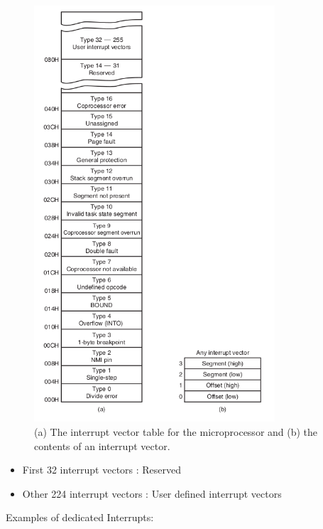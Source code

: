 \begin{figure}[h!]
  \includegraphics[width = 0.8\textwidth]{./figures/Int_Vect.png}
  \caption{(a) The interrupt vector table for the microprocessor and (b) the contents of an interrupt vector.}
\end{figure}
\begin{itemize}
  \item First 32 interrupt vectors : Reserved
  \item Other 224 interrupt vectors : User defined interrupt vectors
\end{itemize}
Examples of dedicated Interrupts:
